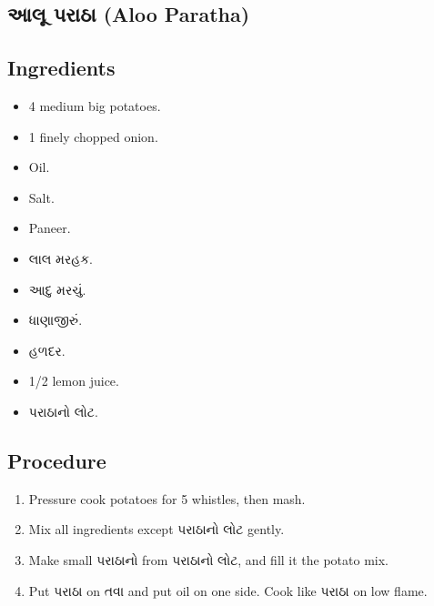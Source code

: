 \documentclass[../../recipes.tex]{subfiles}
\begin{document}
\begin{gujarati}

\chapter{આલૂ પરાઠા (Aloo Paratha)}

\section*{Ingredients}

\begin{itemize}
    \item 4 medium big potatoes.
    \item 1 finely chopped onion.
    \item Oil.
    \item Salt.
    \item Paneer.
    \item લાલ મરહક.
    \item આદુ મરચું.
    \item ધાણાજીરું.
    \item હળદર.
    \item 1/2 lemon juice.
    \item પરાઠાનો લોટ.
\end{itemize}

\noindent
\section*{Procedure}

\begin{enumerate}
    \item Pressure cook potatoes for 5 whistles, then mash.
    \item Mix all ingredients except પરાઠાનો લોટ gently.
    \item Make small પરાઠાનો from પરાઠાનો લોટ, and fill it the potato mix.
    \item Put પરાઠા on તવા and put oil on one side. Cook like પરાઠા on low flame.
\end{enumerate}

\end{gujarati}
\end{document}

